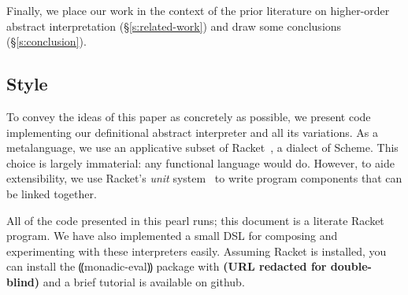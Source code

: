 Finally, we place our work in the context of the prior literature on
higher-order abstract interpretation (\S\ref{s:related-work}) and draw
some conclusions (\S\ref{s:conclusion}).


\subsection*{Style}

To convey the ideas of this paper as concretely as possible, we
present code implementing our definitional abstract interpreter and
all its variations.  As a metalanguage, we use an applicative subset
of Racket~\cite{dvanhorn:plt-tr1}, a dialect of Scheme.  This choice
is largely immaterial: any functional language would do.  However, to
aide extensibility, we use Racket's \emph{unit}
system~\cite{local:flatt-pldi98} to write program components that can
be linked together.

All of the code presented in this pearl runs; this document is a
literate Racket program.  We have also implemented a small DSL for
composing and experimenting with these interpreters easily.  Assuming
Racket is installed, you can install the ⸨monadic-eval⸩ package with
{\bf (URL redacted for double-blind)} and a brief tutorial is
available on github.





